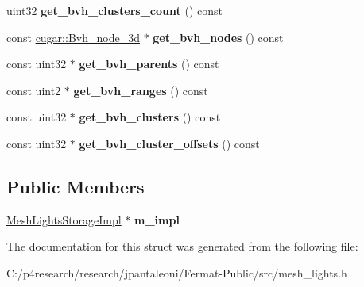 \begin{DoxyCompactItemize}
uint32 {\bfseries get\+\_\+bvh\+\_\+clusters\+\_\+count} () const
\item 
\mbox{\label{struct_mesh_lights_storage_a53cd69ff8189c7ce02b0d32d4b87ca24}} 
const \hyperlink{structcugar_1_1_bvh__node__3d}{cugar\+::\+Bvh\+\_\+node\+\_\+3d} $\ast$ {\bfseries get\+\_\+bvh\+\_\+nodes} () const
\item 
\mbox{\label{struct_mesh_lights_storage_a24fc19f8ad520efc3e34ac5fcb5d742e}} 
const uint32 $\ast$ {\bfseries get\+\_\+bvh\+\_\+parents} () const
\item 
\mbox{\label{struct_mesh_lights_storage_adb10f67f2a2650676bc1fa056ffefd04}} 
const uint2 $\ast$ {\bfseries get\+\_\+bvh\+\_\+ranges} () const
\item 
\mbox{\label{struct_mesh_lights_storage_ad383e1c0ce0bfeaf819173684f481055}} 
const uint32 $\ast$ {\bfseries get\+\_\+bvh\+\_\+clusters} () const
\item 
\mbox{\label{struct_mesh_lights_storage_ae88ba4fa7b16943e373762eecb562736}} 
const uint32 $\ast$ {\bfseries get\+\_\+bvh\+\_\+cluster\+\_\+offsets} () const
\end{DoxyCompactItemize}
\subsection*{Public Members}
\begin{DoxyCompactItemize}
\item 
\mbox{\label{struct_mesh_lights_storage_a6928e1339dab0265be378491c3a4cf1b}} 
\hyperlink{struct_mesh_lights_storage_impl}{Mesh\+Lights\+Storage\+Impl} $\ast$ {\bfseries m\+\_\+impl}
\end{DoxyCompactItemize}


The documentation for this struct was generated from the following file\+:\begin{DoxyCompactItemize}
\item 
C\+:/p4research/research/jpantaleoni/\+Fermat-\/\+Public/src/mesh\+\_\+lights.\+h\end{DoxyCompactItemize}
